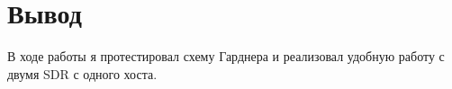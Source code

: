 \chapter{Вывод}
\label{ch:chap3}

В ходе работы я протестировал схему Гарднера и реализовал удобную работу с двумя SDR с одного хоста.
\endinput